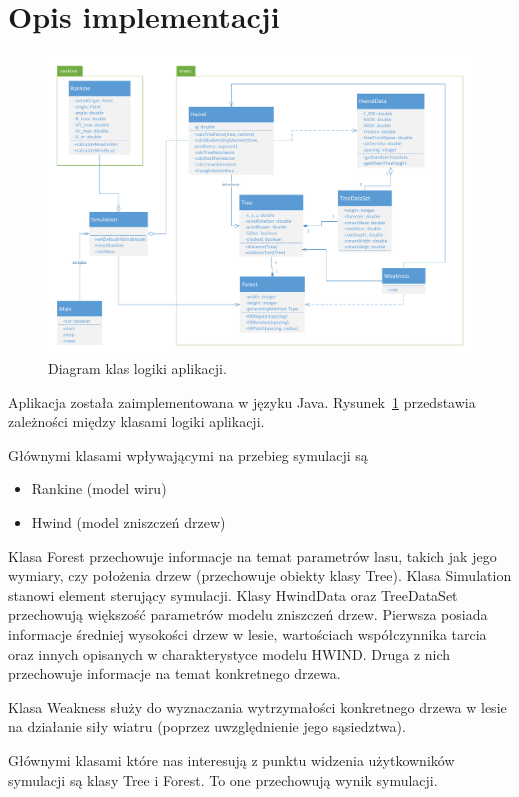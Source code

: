 \section{Opis implementacji}

\begin{figure}[!h]
	\center
	\includegraphics[scale=0.51]{uml}
	\caption{Diagram klas logiki aplikacji.}
	\label{fig:uml1}
\end{figure} 

Aplikacja została zaimplementowana w języku Java. 
Rysunek~\ref{fig:uml1} przedstawia zależności między klasami logiki aplikacji.

Głównymi klasami wpływającymi na przebieg symulacji są 
\begin{itemize}
\item Rankine (model wiru)
\item Hwind (model zniszczeń drzew)
\end{itemize}
Klasa Forest przechowuje informacje na temat parametrów lasu, takich jak jego wymiary, czy położenia drzew (przechowuje obiekty klasy Tree). Klasa Simulation stanowi element sterujący symulacji.
Klasy HwindData oraz TreeDataSet przechowują większość parametrów modelu zniszczeń drzew. Pierwsza posiada informacje średniej wysokości drzew w lesie, wartościach współczynnika tarcia oraz innych opisanych w charakterystyce modelu HWIND.
Druga z nich przechowuje informacje na temat konkretnego drzewa.

Klasa Weakness służy do wyznaczania wytrzymałości konkretnego drzewa w lesie na działanie siły wiatru (poprzez uwzględnienie jego sąsiedztwa).

Głównymi klasami które nas interesują z punktu widzenia użytkowników symulacji są klasy Tree i Forest. To one przechowują wynik symulacji.

